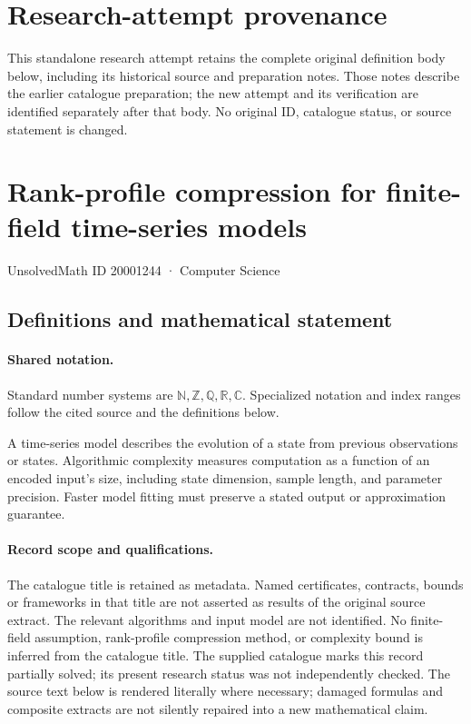 \documentclass[11pt]{article}
\begin{document}
\section*{Research-attempt provenance}
This standalone research attempt retains the complete original definition body below,
including its historical source and preparation notes. Those notes describe the
earlier catalogue preparation; the new attempt and its verification are identified
separately after that body. No original ID, catalogue status, or source statement is changed.

\section{Rank-profile compression for finite-field time-series models}\label{20001244}
{\small UnsolvedMath ID 20001244 · Computer Science}
\subsection{Definitions and mathematical statement}

\paragraph{Shared notation.}Standard number systems are $\mathbb N,\mathbb Z,\mathbb Q,\mathbb R,\mathbb C$. Specialized notation and index ranges follow the cited source and the definitions below.


A time-series model describes the evolution of a state from previous observations or states. Algorithmic complexity measures computation as a function of an encoded input's size, including state dimension, sample length, and parameter precision. Faster model fitting must preserve a stated output or approximation guarantee.
\paragraph{Record scope and qualifications.}
The catalogue title is retained as metadata. Named certificates, contracts, bounds or frameworks in that title are not asserted as results of the original source extract.
The relevant algorithms and input model are not identified. No finite-field assumption, rank-profile compression method, or complexity bound is inferred from the catalogue title. The supplied catalogue marks this record partially solved; its present research status was not independently checked.
The source text below is rendered literally where necessary; damaged formulas and composite extracts are not silently repaired into a new mathematical claim.
\end{document}
